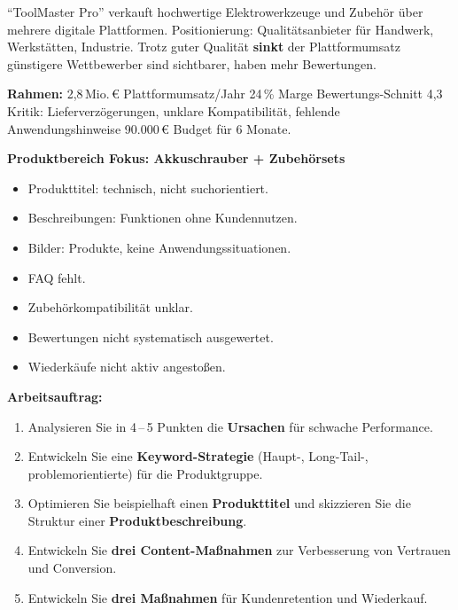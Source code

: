 \documentclass[11pt,a4paper,oneside]{article}
\begin{document}
\begin{infobox}
``ToolMaster Pro'' verkauft hochwertige Elektrowerkzeuge und Zubehör über mehrere digitale Plattformen. Positionierung: Qualitätsanbieter für Handwerk, Werkstätten, Industrie. Trotz guter Qualität \textbf{sinkt} der Plattformumsatz \textendash{} günstigere Wettbewerber sind sichtbarer, haben mehr Bewertungen.

\smallskip
\textbf{Rahmen:} 2,8\,Mio.\,\euro{} Plattformumsatz/Jahr \textperiodcentered{} 24\,\% Marge \textperiodcentered{} Bewertungs-Schnitt 4,3 \textperiodcentered{} Kritik: Lieferverzögerungen, unklare Kompatibilität, fehlende Anwendungshinweise \textperiodcentered{} 90.000\,\euro{} Budget für 6 Monate.

\smallskip
\textbf{Produktbereich Fokus: Akkuschrauber + Zubehörsets}
\begin{itemize}
  \item Produkttitel: technisch, nicht suchorientiert.
  \item Beschreibungen: Funktionen ohne Kundennutzen.
  \item Bilder: Produkte, keine Anwendungssituationen.
  \item FAQ fehlt.
  \item Zubehörkompatibilität unklar.
  \item Bewertungen nicht systematisch ausgewertet.
  \item Wiederkäufe nicht aktiv angestoßen.
\end{itemize}
\end{infobox}

\noindent\textbf{Arbeitsauftrag:}

\begin{enumerate}
  \item Analysieren Sie in 4\,--\,5 Punkten die \textbf{Ursachen} für schwache Performance.
  \item Entwickeln Sie eine \textbf{Keyword-Strategie} (Haupt-, Long-Tail-, problemorientierte) für die Produktgruppe.
  \item Optimieren Sie beispielhaft einen \textbf{Produkttitel} und skizzieren Sie die Struktur einer \textbf{Produktbeschreibung}.
  \item Entwickeln Sie \textbf{drei Content-Maßnahmen} zur Verbesserung von Vertrauen und Conversion.
  \item Entwickeln Sie \textbf{drei Maßnahmen} für Kundenretention und Wiederkauf.
\end{enumerate}
\end{document}
